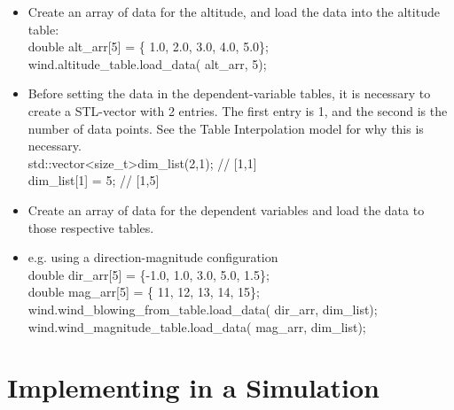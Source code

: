 \documentclass[11pt,fleqn]{report}
\begin{document}
\begin{itemize}
\item Create an array of data for the altitude, and load the data into the altitude table:\\
\indent\hspace{1cm} \colorbox{customorange}{double alt\_arr[5] = \{ 1.0, 2.0, 3.0, 4.0, 5.0\};}\\
\indent\hspace{1cm} \colorbox{customorange}{wind.altitude\_table.load\_data( alt\_arr, 5);}

\item Before setting the data in the dependent-variable tables, it is necessary to create a STL-vector with 2 entries.  The first entry is 1, and the second is the number of data points.  See the Table Interpolation model for why this is necessary.\\
\indent\hspace{1cm} \colorbox{customorange}{std::vector\textless size\_t\textgreater \enspace dim\_list(2,1); \enspace // [1,1]}\\
\indent\hspace{1cm} \colorbox{customorange}{dim\_list[1] = 5;  \enspace  // [1,5]}

\item Create an array of data for the dependent variables and load the data to those respective tables.  
    
\item e.g. using a direction-magnitude configuration\\
\indent\hspace{1cm} \colorbox{customorange}{double dir\_arr[5] = \{-1.0, 1.0, 3.0, 5.0, 1.5\};}\\
\indent\hspace{1cm} \colorbox{customorange}{double mag\_arr[5] = \{  11,  12,  13,  14,  15\};}\\
\indent\hspace{1cm} \colorbox{customorange}{wind.wind\_blowing\_from\_table.load\_data( dir\_arr, dim\_list);}\\
\indent\hspace{1cm} \colorbox{customorange}{wind.wind\_magnitude\_table.load\_data( mag\_arr, dim\_list);}

\end{itemize}

\newpage
\section{Implementing in a Simulation}
\end{document}
